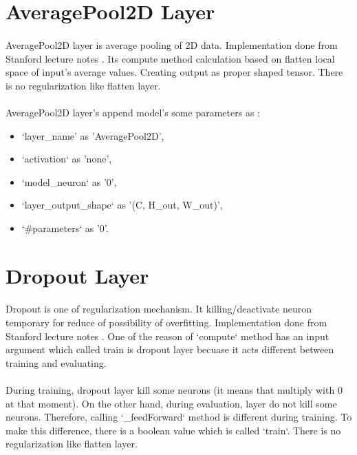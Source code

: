 \documentclass[12pt]{report}
\begin{document}
\section{AveragePool2D Layer}

\paragraph{}
AveragePool2D layer is average pooling of 2D data. Implementation done from Stanford lecture notes \cite{cs231}. Its compute method calculation based on flatten local space of input's average values. Creating output as proper shaped tensor. There is no regularization like flatten layer.

\paragraph{}
AveragePool2D layer's append model's some parameters as :
\begin{itemize}
	\item `layer\_name' as 'AveragePool2D',
	\item `activation` as 'none',
	\item `model\_neuron` as '0',
	\item `layer\_output\_shape` as '(C, H\_out, W\_out)',
	\item `\#parameters` as '0'.
\end{itemize}



\section{Dropout Layer}

\paragraph{}
Dropout is one of regularization mechanism. It killing/deactivate neuron temporary for reduce of possibility of overfitting. Implementation done from Stanford lecture notes \cite{cs231}. One of the reason of `compute` method has an input argument which called train is dropout layer becuase it acts different between training and evaluating. 

\paragraph{}
During training, dropout layer kill some neurons (it means that multiply with 0 at that moment). On the other hand, during evaluation, layer do not kill some neurons. Therefore, calling `\_feedForward` method is different during training. To make this difference, there is a boolean value which is called `train`. There is no regularization like flatten layer.
\end{document}
